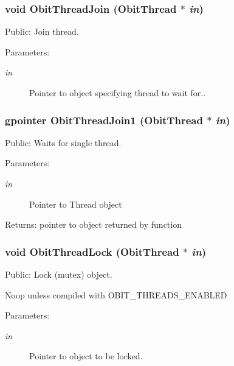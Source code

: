 \subsubsection{\setlength{\rightskip}{0pt plus 5cm}void Obit\-Thread\-Join ({\bf Obit\-Thread} $\ast$ {\em in})}\label{ObitThread_8c_a16}


Public: Join thread. 

\begin{Desc}
\item[Parameters:]
\begin{description}
\item[{\em in}]Pointer to object specifying thread to wait for.. \end{description}
\end{Desc}
\subsubsection{\setlength{\rightskip}{0pt plus 5cm}gpointer Obit\-Thread\-Join1 ({\bf Obit\-Thread} $\ast$ {\em in})}\label{ObitThread_8c_a27}


Public: Waits for single thread. 

\begin{Desc}
\item[Parameters:]
\begin{description}
\item[{\em in}]Pointer to Thread object \end{description}
\end{Desc}
\begin{Desc}
\item[Returns:]pointer to object returned by function \end{Desc}
\subsubsection{\setlength{\rightskip}{0pt plus 5cm}void Obit\-Thread\-Lock ({\bf Obit\-Thread} $\ast$ {\em in})}\label{ObitThread_8c_a7}


Public: Lock (mutex) object. 

Noop unless compiled with OBIT\_\-THREADS\_\-ENABLED \begin{Desc}
\item[Parameters:]
\begin{description}
\item[{\em in}]Pointer to object to be locked. \end{description}
\end{Desc}

